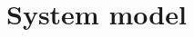 \documentclass[lettersize,journal]{IEEEtran}
\begin{document}









\section{System model}
\end{document}
